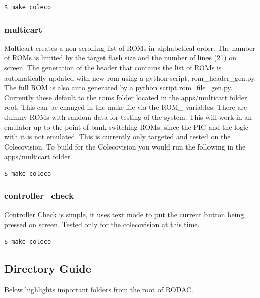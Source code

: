 \documentclass{article}
\begin{document}
  \begin{lstlisting}[language=bash]
    $ make coleco
  \end{lstlisting}

  \subsubsection{multicart}

  \par
  Multicart creates a non-scrolling list of ROMs in alphabetical order. The number of ROMs is limited by the target flash size and the number of
  lines (21) on screen. The generation of the header that contains the list of ROMs is automatically updated with new rom using a python
  script, rom\_header\_gen.py. The full ROM is also auto generated by a python script rom\_file\_gen.py. Currently these default to the roms folder
  located in the apps/multicart folder root. This can be changed in the make file via the ROM\_\* variables. There are dummy ROMs with random data
  for testing of the system. This will work in an emulator up to the point of bank switching ROMs, since the PIC and the logic with it is not emulated.
  This is currently only targeted and tested on the Colecovision. To build for the Colecovision you would run the following in the apps/multicart folder.

  \begin{lstlisting}[language=bash]
    $ make coleco
  \end{lstlisting}

  \subsubsection{controller\_check}

  \par
  Controller Check is simple, it uses text mode to put the current button being pressed on screen. Tested only for the colecovision at this time.

  \begin{lstlisting}[language=bash]
    $ make coleco
  \end{lstlisting}

  \subsection{Directory Guide}

  \par
  Below highlights important folders from the root of RODAC.
\end{document}
